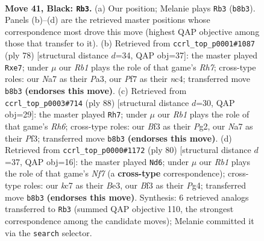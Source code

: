 \documentclass[11pt]{article}
\begin{document}
\clearpage

\begin{figure}[p]\centering
\begin{subfigure}{0.46\textwidth}\centering
\resizebox{\linewidth}{!}{%
\newchessgame
\chessboard[
  setfen={1r4k1/n1K2p1p/p1P5/P4p2/4p3/5bP1/8/RNB5 b - - 0 41},
  showmover=false,
  pgfstyle=straightmove, color=movearrow, markmove={b8-b3}
]}
\caption{}
\end{subfigure}\hfill
\begin{subfigure}{0.46\textwidth}\centering
\resizebox{\linewidth}{!}{%
\newchessgame
\chessboard[
  setfen={3r2k1/pp2p2R/6B1/1P6/2np3P/P5PK/8/8 w - - 2 40},
  showmover=false,
  pgfstyle=straightmove, color=movearrow, markmove={h7-e7}
]}
\caption{}
\end{subfigure}
\\[4pt]
\begin{subfigure}{0.46\textwidth}\centering
\resizebox{\linewidth}{!}{%
\newchessgame
\chessboard[
  setfen={8/r3bp2/7R/3pP1k1/p6p/2B2P2/3PK1P1/8 w - - 1 45},
  showmover=false,
  pgfstyle=straightmove, color=movearrow, markmove={h6-h7}
]}
\caption{}
\end{subfigure}\hfill
\begin{subfigure}{0.46\textwidth}\centering
\resizebox{\linewidth}{!}{%
\newchessgame
\chessboard[
  setfen={2r3k1/3R1N1p/6p1/p1n5/P1p3P1/4B2P/5P2/b4K2 w - - 3 41},
  showmover=false,
  pgfstyle=straightmove, color=movearrow, markmove={f7-d6}
]}
\caption{}
\end{subfigure}
\caption{\textbf{Move 41, Black: \texttt{Rb3}.} (a) Our position; Melanie plays \texttt{Rb3} (\texttt{b8b3}). Panels (b)--(d) are the retrieved master positions whose correspondence most drove this move (highest QAP objective among those that transfer to it). (b) Retrieved from \texttt{ccrl\_top\_p0001\#1087} (ply 78) [structural distance $d$=34, QAP obj=37]: the master played \texttt{Rxe7}; under $\mu$ our \emph{Rb1} plays the role of that game's \emph{Rh7}; cross-type roles: our \emph{N}a7 as their \emph{P}a3, our \emph{P}f7 as their \emph{n}c4; transferred move \texttt{b8b3} \textbf{(endorses this move)}. (c) Retrieved from \texttt{ccrl\_top\_p0003\#714} (ply 88) [structural distance $d$=30, QAP obj=29]: the master played \texttt{Rh7}; under $\mu$ our \emph{Rb1} plays the role of that game's \emph{Rh6}; cross-type roles: our \emph{B}f3 as their \emph{P}g2, our \emph{N}a7 as their \emph{P}f3; transferred move \texttt{b8b3} \textbf{(endorses this move)}. (d) Retrieved from \texttt{ccrl\_top\_p0000\#1172} (ply 80) [structural distance $d$=37, QAP obj=16]: the master played \texttt{Nd6}; under $\mu$ our \emph{Rb1} plays the role of that game's \emph{Nf7} (a \textbf{cross-type} correspondence); cross-type roles: our \emph{k}c7 as their \emph{B}e3, our \emph{B}f3 as their \emph{P}g4; transferred move \texttt{b8b3} \textbf{(endorses this move)}. Synthesis: 6 retrieved analogs transferred to \texttt{Rb3} (summed QAP objective 110, the strongest correspondence among the candidate moves); Melanie committed it via the \texttt{search} selector.}
\label{fig:thought-m81}
\end{figure}
\end{document}
